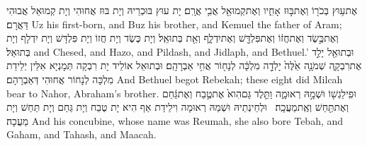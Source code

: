 {אֶת\maqqaf ע֥וּץ בְּכֹר֖וֹ וְאֶת\maqqaf בּ֣וּז אָחִ֑יו וְאֶת\maqqaf קְמוּאֵ֖ל אֲבִ֥י אֲרָֽם׃}
{יָת עוּץ בּוּכְרֵיהּ וְיָת בּוּז אֲחוּהִי וְיָת קְמוּאֵל אֲבוּהִי דַּאֲרָם׃}
{Uz his first-born, and Buz his brother, and Kemuel the father of Aram;}{}
{וְאֶת\maqqaf כֶּ֣שֶׂד וְאֶת\maqqaf חֲז֔וֹ וְאֶת\maqqaf פִּלְדָּ֖שׁ וְאֶת\maqqaf יִדְלָ֑ף וְאֵ֖ת בְּתוּאֵֽל׃}
{וְיָת כֶּשֶׂד וְיָת חֲזוֹ וְיָת פִּלְדָּשׁ וְיָת יִדְלָף וְיָת בְּתוּאֵל׃}
{and Chesed, and Hazo, and Pildash, and Jidlaph, and Bethuel.’}{}
{וּבְתוּאֵ֖ל יָלַ֣ד אֶת\maqqaf רִבְקָ֑ה שְׁמֹנָ֥ה אֵ֙לֶּה֙ יָלְדָ֣ה מִלְכָּ֔ה לְנָח֖וֹר אֲחִ֥י אַבְרָהָֽם׃}
{וּבְתוּאֵל אוֹלֵיד יָת רִבְקָה תְּמָנְיָא אִלֵּין יְלֵידַת מִלְכָּה לְנָחוֹר אֲחוּהִי דְּאַבְרָהָם׃}
{And Bethuel begot Rebekah; these eight did Milcah bear to Nahor, Abraham’s brother.}{}
{וּפִֽילַגְשׁ֖וֹ וּשְׁמָ֣הּ רְאוּמָ֑ה וַתֵּ֤לֶד גַּם\maqqaf הִוא֙ אֶת\maqqaf טֶ֣בַח וְאֶת\maqqaf גַּ֔חַם וְאֶת\maqqaf תַּ֖חַשׁ וְאֶֽת\maqqaf מַעֲכָֽה׃ \petucha }
{וּלְחֵינְתֵיהּ וּשְׁמַהּ רְאוּמָה וִילֵידַת אַף הִיא יָת טֶבַח וְיָת גַּחַם וְיָת תַּחַשׁ וְיָת מַעֲכָה׃}
{And his concubine, whose name was Reumah, she also bore Tebah, and Gaham, and Tahash, and Maacah.}{}


